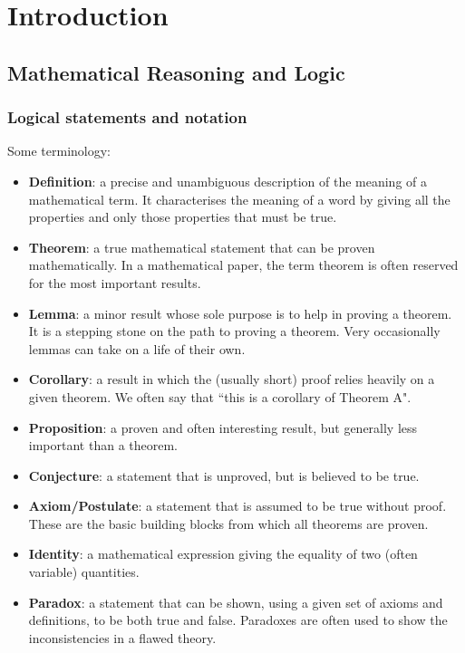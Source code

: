 \part{Introduction}
\chapter{Mathematical Reasoning and Logic}

\section{Logical statements and notation}
Some terminology:
\begin{itemize}
\item \textbf{Definition}: a precise and unambiguous description of the meaning of a mathematical term. It characterises the meaning of a word by giving all the properties and only those properties that must be true.

\item \textbf{Theorem}: a true mathematical statement that can be proven mathematically. In a mathematical paper, the term theorem is often reserved for the most important results.

\item \textbf{Lemma}: a minor result whose sole purpose is to help in proving a theorem. It is a stepping stone on the path to proving a theorem. Very occasionally lemmas can take on a life of their own.

\item \textbf{Corollary}: a result in which the (usually short) proof relies heavily on a given theorem. We often say that ``this is a corollary of Theorem A".

\item \textbf{Proposition}: a proven and often interesting result, but generally less important than a theorem.

\item \textbf{Conjecture}: a statement that is unproved, but is believed to be true.

\item \textbf{Axiom/Postulate}: a statement that is assumed to be true without proof. These are the basic building blocks from which all theorems are proven.

\item \textbf{Identity}: a mathematical expression giving the equality of two (often variable) quantities.

\item \textbf{Paradox}: a statement that can be shown, using a given set of axioms and definitions, to be both true and false. Paradoxes are often used to show the inconsistencies in a flawed theory.
\end{itemize}

